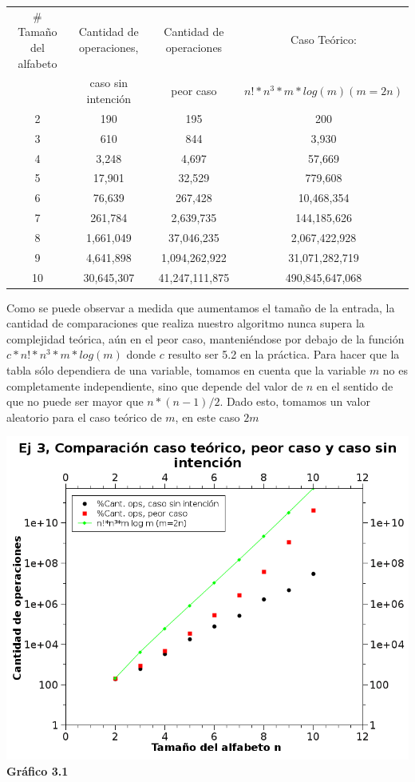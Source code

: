 \documentclass[a4paper, 10pt]{article}
\begin{document}
\begin{center}
\begin{tabular}{|c|c|c|c|}
\hline
\# Tamaño del alfabeto & Cantidad de operaciones, & Cantidad de operaciones & Caso Teórico:\\
& caso sin intención & peor caso & $n!*n^{3}*m* log (m) (m=2n)$\\
\hline
2 & 190 & 195 & 200\\
\hline
3 & 610 & 844 & 3,930\\
\hline
4 & 3,248 & 4,697 & 57,669\\
\hline
5 & 17,901 & 32,529 & 779,608\\
\hline
6 & 76,639 & 267,428 & 10,468,354\\
\hline
7 & 261,784 & 2,639,735 & 144,185,626\\
\hline
8 & 1,661,049 & 37,046,235 & 2,067,422,928\\
\hline
9 & 4,641,898 & 1,094,262,922 & 31,071,282,719\\
\hline
10 & 30,645,307 & 41,247,111,875 & 490,845,647,068\\
\hline


\end{tabular}
\end{center} \vspace{0,15cm}

Como se puede observar a medida que aumentamos el tamaño de la entrada, la cantidad de comparaciones que realiza nuestro algoritmo nunca supera la complejidad teórica, aún en el peor caso, manteniéndose por debajo de la función $c*n!*n^{3}*m* log (m)$ donde $c$ resulto ser 5.2 en la práctica. Para hacer que la tabla sólo dependiera de una variable, tomamos en cuenta que la variable $m$ no es completamente independiente, sino que depende del valor de $n$ en el sentido de que no puede ser mayor que $n*(n-1)/2$. Dado esto, tomamos un valor aleatorio para el caso teórico de $m$, en este caso $2m$


\begin{center}
\includegraphics[scale=0.60]{graficos/3-ejG1.png} \\
\scriptsize{\textsf{\textbf{Gr\'afico 3.1}}}  \\
\end{center}
\end{document}
